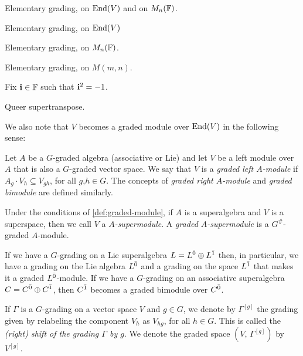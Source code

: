 \begin{defi}\label{defi:elementary-grd}
    Elementary grading, on $\operatorname{End}(V)$ and on $M_n(\mathbb{F})$.
\end{defi}

\begin{defi}\label{defi:elementary-grd-abstract}
    Elementary grading, on $\operatorname{End}(V)$
\end{defi}

\begin{defi}\label{defi:elementary-grd-matrix}
    Elementary grading, on $M_n(\mathbb{F})$.
\end{defi}

\begin{defi}\label{defi:elementary-grd-super}
    Elementary grading, on $M(m,n)$.
\end{defi}

Fix $\mathbf{i} \in \mathbb{F}$ such that $\mathbf{i}^2 = -1$.

\begin{defi}\label{def:queer-stp}
    Queer supertranspose.
\end{defi}

We also note that $V$ becomes a graded module over $\operatorname{End}(V)$ in the following sense:

\begin{defi}\label{def:graded-module}
	Let $A$ be a $G$-graded algebra (associative or Lie) and let $V$ be a left module over $A$ that is also a $G$-graded vector space. 
	We say that $V$ is a \emph{graded left $A$-module} if $A_g \cdot V_h \subseteq V_{gh}$, for all $g$,$h\in G$. 
	The concepts of \emph{graded right $A$-module} and \emph{graded bimodule} are defined similarly.
\end{defi}

Under the conditions of \cref{def:graded-module}, if $A$ is a superalgebra and $V$ is a superspace, then we call $V$ a \emph{$A$-supermodule}. 
A \emph{graded $A$-supermodule} is a $G^\#$-graded $A$-module.

If we have a $G$-grading on a Lie superalgebra $L=L^{\bar0} \oplus L^{\bar1}$ then, in particular, we have a grading on the Lie algebra $L^{\bar0}$ and a grading on the space $L^{\bar1}$ that makes it a graded $L^{\bar0}$-module. If we have a $G$-grading on an associative superalgebra $C=C^{\bar0} \oplus C^{\bar1}$, then $C^{\bar1}$ becomes a graded bimodule over $C^{\bar0}$.

If $ \Gamma$ is a $G$-grading on a vector space $V$ and $g\in G$, we denote by $\Gamma^{[g]} $ the grading given by relabeling the component
$V_h$ as $V_{hg}$, for all $h \in G$. This is called the \emph{(right) shift of the grading $\Gamma$ by $g$}.
We denote the graded space $(V, \,  \Gamma^{[g]})$ by $V^{[g]}$.


